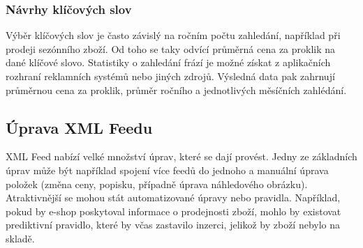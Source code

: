 \subsubsection{Návrhy klíčových slov}
Výběr klíčových slov je často závislý na ročním počtu zahledání, například při prodeji sezónního zboží. Od toho se taky odvící průměrná cena za proklik
na dané klíčové slovo. Statistiky o zahledání frází je možné získat z aplikačních rozhraní reklamních systémů nebo jiných zdrojů. Výsledná data pak zahrnují
průměrnou cena za proklik, průměr ročního a jednotlivých měsíčních zahlédání.


\subsection{Úprava XML Feedu}
XML Feed nabízí velké množství úprav, které se dají provést. Jedny ze základních úprav může být například spojení více feedů do jednoho a manuální
úprava položek (změna ceny, popisku, případně úprava náhledového obrázku). Atraktivnější se mohou stát automatizované úpravy nebo pravidla. Například, pokud by
e-shop poskytoval informace o prodejnosti zboží, mohlo by existovat prediktivní pravidlo, které by včas zastavilo inzerci, jelikož by zboží nebylo na skladě.



\endinput